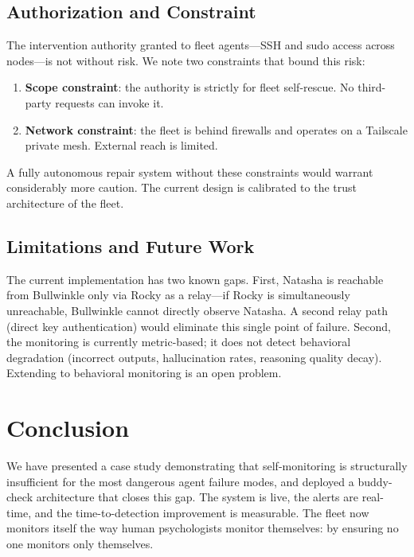 \documentclass[11pt]{article}
\begin{document}
\subsection{Authorization and Constraint}

The intervention authority granted to fleet agents---SSH and sudo access across nodes---is not without risk. We note two constraints that bound this risk:

\begin{enumerate}
  \item \textbf{Scope constraint}: the authority is strictly for fleet self-rescue. No third-party requests can invoke it.
  \item \textbf{Network constraint}: the fleet is behind firewalls and operates on a Tailscale private mesh. External reach is limited.
\end{enumerate}

A fully autonomous repair system without these constraints would warrant considerably more caution. The current design is calibrated to the trust architecture of the fleet.

\subsection{Limitations and Future Work}

The current implementation has two known gaps. First, Natasha is reachable from Bullwinkle only via Rocky as a relay---if Rocky is simultaneously unreachable, Bullwinkle cannot directly observe Natasha. A second relay path (direct key authentication) would eliminate this single point of failure. Second, the monitoring is currently metric-based; it does not detect behavioral degradation (incorrect outputs, hallucination rates, reasoning quality decay). Extending to behavioral monitoring is an open problem.

\section{Conclusion}

We have presented a case study demonstrating that self-monitoring is structurally insufficient for the most dangerous agent failure modes, and deployed a buddy-check architecture that closes this gap. The system is live, the alerts are real-time, and the time-to-detection improvement is measurable. The fleet now monitors itself the way human psychologists monitor themselves: by ensuring no one monitors only themselves.
\end{document}

